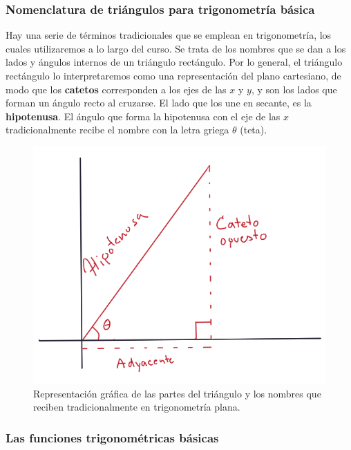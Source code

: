 \documentclass[
]{book}
\begin{document}
\hypertarget{nomenclatura-de-triuxe1ngulos-para-trigonometruxeda-buxe1sica}{%
\subsubsection{Nomenclatura de triángulos para trigonometría básica}\label{nomenclatura-de-triuxe1ngulos-para-trigonometruxeda-buxe1sica}}

Hay una serie de términos tradicionales que se emplean en trigonometría, los cuales utilizaremos a lo largo del curso. Se trata de los nombres que se dan a los lados y ángulos internos de un triángulo rectángulo. Por lo general, el triángulo rectángulo lo interpretaremos como una representación del plano cartesiano, de modo que los \textbf{catetos} corresponden a los ejes de las \(x\) y \(y\), y son los lados que forman un ángulo recto al cruzarse. El lado que los une en secante, es la \textbf{hipotenusa}. El ángulo que forma la hipotenusa con el eje de las \(x\) tradicionalmente recibe el nombre con la letra griega \(\theta\) (teta).

\begin{figure}

{\centering \includegraphics[width=7.86in]{Unidad-I/nomenclatura} 

}

\caption{Representación gráfica de las partes del triángulo y los nombres que reciben tradicionalmente en trigonometría plana.}\label{fig:nomen-trig}
\end{figure}

\hypertarget{las-funciones-trigonomuxe9tricas-buxe1sicas}{%
\subsubsection{Las funciones trigonométricas básicas}\label{las-funciones-trigonomuxe9tricas-buxe1sicas}}
\end{document}
